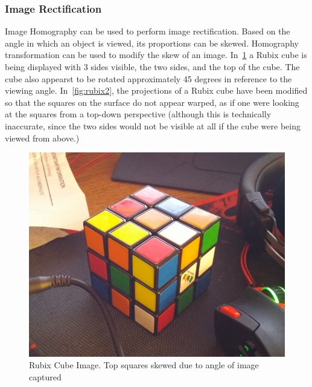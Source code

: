 \documentclass[12pt,journal,compsoc]{IEEEtran}
\begin{document}
\subsubsection{Image Rectification}
Image Homography can be used to perform image rectification. Based on the angle in which an object is viewed, its proportions can be skewed. Homography transformation can be used to modify the skew of an image. In~\ref{fig:rubix1} a Rubix cube is being displayed with 3 sides visible, the two sides, and the top of the cube. The cube also appearst to be rotated approximately 45 degrees in reference to the viewing angle. In~\ref{fig:rubix2}, the projections of a Rubix cube have been modified so that the squares on the surface do not appear warped, as if one were looking at the squares from a top-down perspective (although this is technically inaccurate, since the two sides would not be visible at all if the cube were being viewed from above.)
\begin{figure}[h]
	\centering
		  \centering
		  \includegraphics[width=1\linewidth]{img/rubix1}
		  \caption{Rubix Cube Image. Top squares skewed due to angle of image captured}
		  \label{fig:rubix1}
\end{figure}
\end{document}
